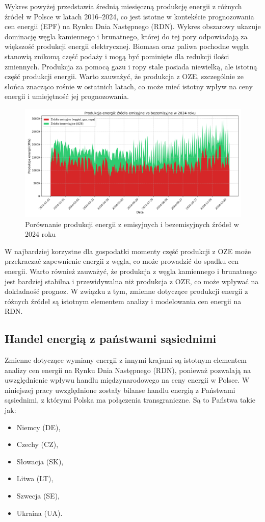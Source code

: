 Wykres powyżej przedstawia średnią miesięczną produkcję energii z różnych źródeł w Polsce w latach 2016–2024, co jest istotne w kontekście prognozowania cen energii (EPF) na Rynku Dnia Następnego (RDN). Wykres obszarowy ukazuje dominację węgla kamiennego i brunatnego, której do tej pory odpowiadają za większość produkcji energii elektrycznej. Biomasa oraz paliwa pochodne węgla stanowią znikomą część podaży i mogą być pominięte dla redukcji ilości zmiennych. Produkcja za pomocą gazu i ropy stale posiada niewielką, ale istotną część produkcji energii. Warto zauważyć, że produkcja z OZE, szczególnie ze słońca znacząco rośnie w ostatnich latach, co może mieć istotny wpływ na ceny energii i umiejętność jej prognozowania. 
\begin{figure}[H]
    \centering
    \includegraphics[width=\textwidth]{../plots/energy/emission_vs_non_emission_2024.png}
    \caption{Porównanie produkcji energii z emisyjnych i bezemisyjnych źródeł w 2024 roku}
    \label{fig:emission-vs-non-emission-2024}
\end{figure}
W najbardziej korzystne dla gospodatki momenty część produkcji z OZE może przekraczać zapewnienie energii z węgla, co może prowadzić do spadku cen energii. Warto również zauważyć, że produkcja z węgla kamiennego i brunatnego jest bardziej stabilna i przewidywalna niż produkcja z OZE, co może wpływać na dokładność prognoz. W związku z tym, zmienne dotyczące produkcji energii z różnych źródeł są istotnym elementem analizy i modelowania cen energii na RDN.

\subsection{Handel energią z państwami sąsiednimi}
\label{subsec:trade}
Zmienne dotyczące wymiany energii z innymi krajami są istotnym elementem analizy cen energii na Rynku Dnia Następnego (RDN), ponieważ pozwalają na uwzględnienie wpływu handlu międzynarodowego na ceny energii w Polsce. W niniejszej pracy uwzględnione zostały bilanse handlu energią z Państwami sąsiednimi, z którymi Polska ma połączenia transgraniczne. Są to Państwa takie jak:
\begin{itemize}
    \item Niemcy (DE),
    \item Czechy (CZ),
    \item Słowacja (SK),
    \item Litwa (LT),
    \item Szwecja (SE),
    \item Ukraina (UA).
\end{itemize}

